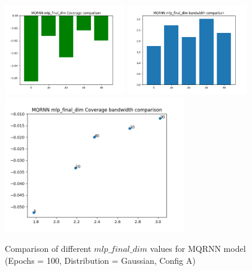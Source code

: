 \documentclass[a4paper, 12pt]{article}
\begin{document}
\begin{figure}[!h]
    \centering
    \includegraphics[width=200px]{plots/hist/a/MQRNN/mlp_final_dim/Coverage.png}
    \includegraphics[width=200px]{plots/hist/a/MQRNN/mlp_final_dim/bandwidth.png}
    \includegraphics[width=300px]{plots/scatter/a/MQRNN/mlp_final_dim/Coverage_bandwidth.png}
    \caption{Comparison of different $mlp\_final\_dim$ values for MQRNN model (Epochs = 100, Distribution = Gaussian, Config A)}
    \label{fig:comp_mqrnn}
\end{figure}
\end{document}
